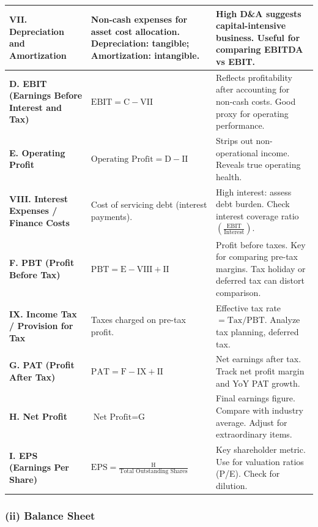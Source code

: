 \documentclass[12pt]{article}
\begin{document}
\begin{longtable}{|>{\raggedright\arraybackslash}p{2.5cm}|>{\raggedright\arraybackslash}p{6cm}|>{\raggedright\arraybackslash}p{4.5cm}|}
\hline
\textbf{VII. Depreciation and Amortization} & Non-cash expenses for asset cost allocation. Depreciation: tangible; Amortization: intangible. & High D\&A suggests capital-intensive business. Useful for comparing EBITDA vs EBIT. \\
\hline
\textbf{D. EBIT (Earnings Before Interest and Tax)} & \( \text{EBIT} = \text{C} - \text{VII} \) & Reflects profitability after accounting for non-cash costs. Good proxy for operating performance. \\
\hline
\textbf{E. Operating Profit} & \( \text{Operating Profit} = \text{D} - \text{II} \) & Strips out non-operational income. Reveals true operating health. \\
\hline
\textbf{VIII. Interest Expenses / Finance Costs} & Cost of servicing debt (interest payments). & High interest: assess debt burden. Check interest coverage ratio \( \left( \frac{\text{EBIT}}{\text{Interest}} \right) \). \\
\hline
\textbf{F. PBT (Profit Before Tax)} & \( \text{PBT} = \text{E} - \text{VIII} + \text{II} \) & Profit before taxes. Key for comparing pre-tax margins. Tax holiday or deferred tax can distort comparison. \\
\hline
\textbf{IX. Income Tax / Provision for Tax} & Taxes charged on pre-tax profit. & Effective tax rate \( = \text{Tax} / \text{PBT} \). Analyze tax planning, deferred tax. \\
\hline
\textbf{G. PAT (Profit After Tax)} & \( \text{PAT} = \text{F} - \text{IX} + \text{II} \) & Net earnings after tax. Track net profit margin and YoY PAT growth. \\
\hline
\textbf{H. Net Profit} & \( \text{Net Profit} = \text{G} \) & Final earnings figure. Compare with industry average. Adjust for extraordinary items. \\
\hline
\textbf{I. EPS (Earnings Per Share)} & \( \text{EPS} = \frac{\text{H}}{\text{Total Outstanding Shares}} \) & Key shareholder metric. Use for valuation ratios (P/E). Check for dilution. \\
\hline

\end{longtable}

\subsubsection*{(ii) Balance Sheet}
\end{document}
